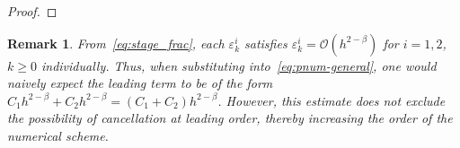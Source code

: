 \documentclass[a4paper,10pt,reqno]{amsart}
\newtheorem{remark}{Remark}[section]
\theoremstyle{definition}
\newcommand{\m}{\mathfrak{m}}
\begin{document}
\begin{proof}

\end{proof}

\begin{remark}\label{rem:theoretical_convergence}
From~\eqref{eq:stage_frac}, each $\varepsilon_k^i$ satisfies $\varepsilon_k^i = \mathcal O(h^{2-\beta})$ for $ i=1,2$, $k\geq 0$ individually. Thus, when substituting into~\eqref{eq:pnum-general}, one would naively expect the leading term to be of the form  $C_1 h^{2-\beta}+C_2h^{2-\beta}=(C_1+C_2) h^{2-\beta}$. However, this estimate does not exclude the possibility of cancellation at leading order, thereby increasing the order of the numerical scheme. 
\end{remark}
\end{document}
